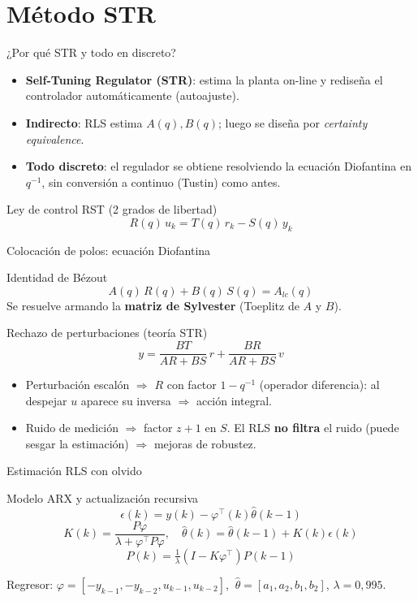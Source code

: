 \documentclass{beamer}
\begin{document}
\section{Método STR}

\begin{frame}{¿Por qué STR y todo en discreto?}
\begin{itemize}
  \item \textbf{Self-Tuning Regulator (STR)}: estima la planta on-line y
  rediseña el controlador automáticamente (autoajuste).
  \item \textbf{Indirecto}: RLS estima $A(q),B(q)$; luego se diseña por
  \emph{certainty equivalence}.
  \item \textbf{Todo discreto}: el regulador se obtiene resolviendo la ecuación
  Diofantina en $q^{-1}$, sin conversión a continuo (Tustin) como antes.
\end{itemize}
\begin{block}{Ley de control RST (2 grados de libertad)}
\[
R(q)\,u_k = T(q)\,r_k - S(q)\,y_k
\]
\end{block}
\end{frame}

\begin{frame}{Colocación de polos: ecuación Diofantina}
\begin{block}{Identidad de Bézout}
\[
A(q)\,R(q) + B(q)\,S(q) = A_{lc}(q)
\]
Se resuelve armando la \textbf{matriz de Sylvester} (Toeplitz de $A$ y $B$).
\end{block}
\begin{block}{Rechazo de perturbaciones (teoría STR)}
\[
y = \frac{BT}{AR+BS}\,r + \frac{BR}{AR+BS}\,v
\]
\begin{itemize}
  \item Perturbación escalón $\Rightarrow$ $R$ con factor $1-q^{-1}$ (operador
  diferencia): al despejar $u$ aparece su inversa $\Rightarrow$ acción integral.
  \item Ruido de medición $\Rightarrow$ factor $z+1$ en $S$. El RLS \textbf{no
  filtra} el ruido (puede sesgar la estimación) $\Rightarrow$ mejoras de robustez.
\end{itemize}
\end{block}
\end{frame}

\begin{frame}{Estimación RLS con olvido}
\begin{block}{Modelo ARX y actualización recursiva}
\[
\epsilon(k) = y(k) - \varphi^\top(k)\hat\theta(k-1)
\]
\[
K(k) = \frac{P\varphi}{\lambda + \varphi^\top P\varphi}, \quad
\hat\theta(k) = \hat\theta(k-1) + K(k)\epsilon(k)
\]
\[
P(k) = \tfrac{1}{\lambda}(I - K\varphi^\top)P(k-1)
\]
\end{block}
Regresor: $\varphi = [-y_{k-1}, -y_{k-2}, u_{k-1}, u_{k-2}]$,
$\ \hat\theta = [a_1,a_2,b_1,b_2]$, $\lambda = 0{,}995$.
\end{frame}
\end{document}
